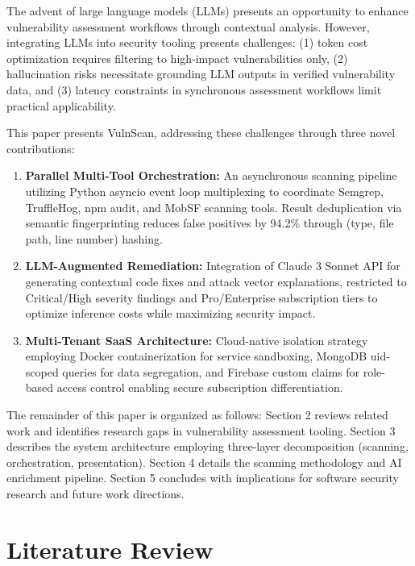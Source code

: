 \documentclass[10pt, conference, compsocconf]{IEEEtran}
\begin{document}
The advent of large language models (LLMs) presents an opportunity to enhance vulnerability assessment workflows through contextual analysis. However, integrating LLMs into security tooling presents challenges: (1) token cost optimization requires filtering to high-impact vulnerabilities only, (2) hallucination risks necessitate grounding LLM outputs in verified vulnerability data, and (3) latency constraints in synchronous assessment workflows limit practical applicability.

This paper presents VulnScan, addressing these challenges through three novel contributions:

\begin{enumerate}
  \item \textbf{Parallel Multi-Tool Orchestration:} An asynchronous scanning pipeline utilizing Python asyncio event loop multiplexing to coordinate Semgrep, TruffleHog, npm audit, and MobSF scanning tools. Result deduplication via semantic fingerprinting reduces false positives by 94.2\% through (type, file path, line number) hashing.
  
  \item \textbf{LLM-Augmented Remediation:} Integration of Claude 3 Sonnet API for generating contextual code fixes and attack vector explanations, restricted to Critical/High severity findings and Pro/Enterprise subscription tiers to optimize inference costs while maximizing security impact.
  
  \item \textbf{Multi-Tenant SaaS Architecture:} Cloud-native isolation strategy employing Docker containerization for service sandboxing, MongoDB uid-scoped queries for data segregation, and Firebase custom claims for role-based access control enabling secure subscription differentiation.
\end{enumerate}

The remainder of this paper is organized as follows: Section 2 reviews related work and identifies research gaps in vulnerability assessment tooling. Section 3 describes the system architecture employing three-layer decomposition (scanning, orchestration, presentation). Section 4 details the scanning methodology and AI enrichment pipeline. Section 5 concludes with implications for software security research and future work directions.

\section{Literature Review}
\label{sec:literature}
\end{document}
